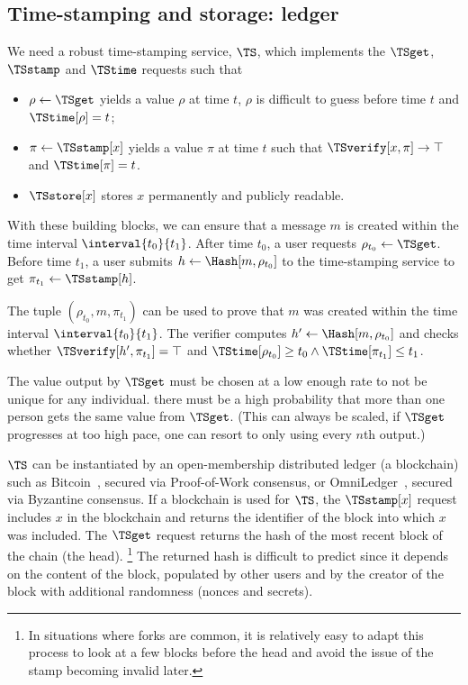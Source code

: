 \subsection{Time-stamping and storage: ledger}%
\label{StorageProperties}\label{timestamp}\label{ledger}

We need a robust time-stamping service, \(\TS\), which implements the \(\TSget\), \(\TSstamp\) and \(\TStime\) requests such that
\begin{itemize}
  \item \(\rho \gets \TSget\) yields a value \(\rho\) at time \(t\), \(\rho\) 
    is difficult to guess before time \(t\) and \(\TStime[\rho] = t\);
  \item \(\pi\gets \TSstamp[x]\) yields a value \(\pi\) at time \(t\) such that 
    \(\TSverify[x, \pi]\to \top\) and \(\TStime[\pi] = t\).
  \item \(\TSstore[x]\) stores \(x\) permanently and publicly readable.
\end{itemize}

With these building blocks, we can ensure that a message \(m\) is created within the time interval \(\interval{t_0}{t_1}\).
After time \(t_0\), a user requests \(\rho_{t_0}\gets \TSget\).
Before time \(t_1\), a user submits \(h\gets \Hash[m, \rho_{t_0}]\) to the time-stamping service to get \(\pi_{t_1}\gets \TSstamp[h]\).

The tuple \((\rho_{t_0}, m, \pi_{t_1})\) can be used to prove that \(m\) was created within the time interval \(\interval{t_0}{t_1}\).
The verifier computes \(h'\gets \Hash[m, \rho_{t_0}]\) and checks whether 
\(\TSverify[h', \pi_{t_1}] = \top\) and \(\TStime[\rho_{t_0}] \geq t_0\land 
  \TStime[\pi_{t_1}] \leq t_1\).

The value output by \(\TSget\) must be chosen at a low enough rate to not be 
unique for any individual.
\Ie there must be a high probability that more than one person gets the same 
value from \(\TSget\).
(This can always be scaled, if \(\TSget\) progresses at too high pace, one can 
resort to only using every \(n\)th output.)

\(\TS\) can be instantiated by an open-membership distributed ledger (\eg a blockchain) such as Bitcoin~\cite{Bitcoin}, secured via Proof-of-Work consensus, or OmniLedger~\cite{OmniLedger}, secured via Byzantine consensus.
If a blockchain is used for \(\TS\), the \(\TSstamp[x]\) request includes \(x\) in the blockchain and returns the identifier of the block into which \(x\) was included.
The \(\TSget\) request returns the hash of the most recent block of the chain 
(\ie the head).%
\footnote{In situations where forks are common, it is relatively easy to adapt this process to look at a few blocks before the head and avoid the issue of the stamp becoming invalid later.}
The returned hash is difficult to predict since it depends on the content of the block, populated by other users and by the creator of the block with additional randomness (\eg nonces and secrets).

